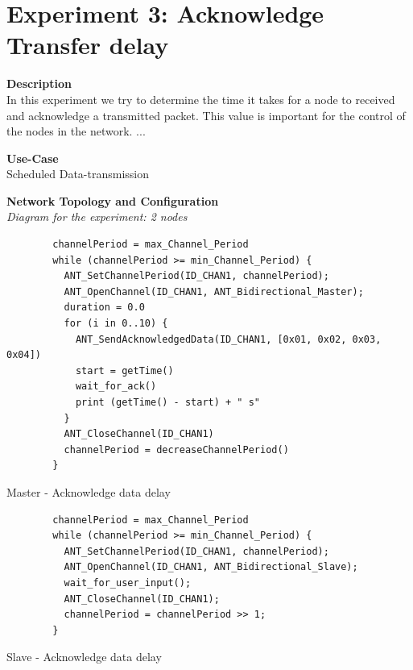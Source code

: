 \section{Experiment 3: Acknowledge Transfer delay}
\begin{description} 
	\item{\textbf{Description}} \hfill \\ In this experiment we try to determine the time it takes for a node to received and acknowledge a transmitted packet. This value is important for the control of the nodes in the network. ...
	\item{\textbf{Use-Case}} \hfill \\ Scheduled Data-transmission
	\item{\textbf{Network Topology and Configuration}} \hfill \\ \textit{Diagram for the experiment:  2 nodes} \\
	\begin{code}
		\begin{verbatim}
		channelPeriod = max_Channel_Period
		while (channelPeriod >= min_Channel_Period) {
		  ANT_SetChannelPeriod(ID_CHAN1, channelPeriod);
		  ANT_OpenChannel(ID_CHAN1, ANT_Bidirectional_Master);
		  duration = 0.0
		  for (i in 0..10) {
		    ANT_SendAcknowledgedData(ID_CHAN1, [0x01, 0x02, 0x03, 0x04])
		    start = getTime()	   
		    wait_for_ack()		
		    print (getTime() - start) + " s"	  
		  }
		  ANT_CloseChannel(ID_CHAN1)		
		  channelPeriod = decreaseChannelPeriod()
		} 
		\end{verbatim}
		\caption{Master - Acknowledge data delay}\label{lst:mExp3}
	\end{code}
	
	\begin{code}
		\begin{verbatim}
		channelPeriod = max_Channel_Period
		while (channelPeriod >= min_Channel_Period) {
		  ANT_SetChannelPeriod(ID_CHAN1, channelPeriod);
		  ANT_OpenChannel(ID_CHAN1, ANT_Bidirectional_Slave);				 
		  wait_for_user_input();
		  ANT_CloseChannel(ID_CHAN1);
		  channelPeriod = channelPeriod >> 1;
		}
		\end{verbatim}
		\caption{Slave - Acknowledge data delay}\label{lst:sExp3}
	\end{code}
	

\end{description}
